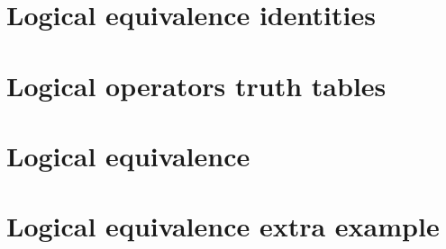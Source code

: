 
\section*{Logical equivalence identities}

\vfill
\section*{Logical operators truth tables}

\vfill
\section*{Logical equivalence}

\vfill
\section*{Logical equivalence extra example}

\vfill
